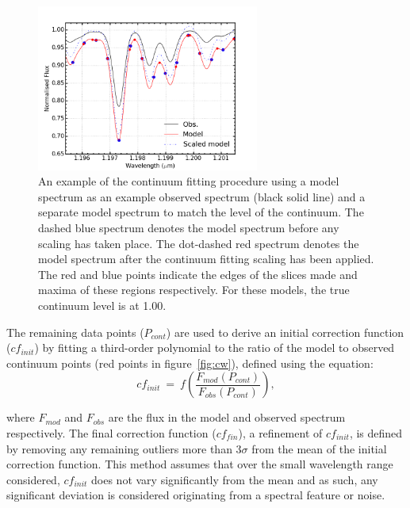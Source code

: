 \begin{figure}
 \centering
\includegraphics[width=0.65\textwidth]{JAnal/cftaction}
\caption[Example of continuum fitting]{
An example of the continuum fitting procedure using a model spectrum as an example observed spectrum (black solid line) and a separate model spectrum to match the level of the continuum.
The dashed blue spectrum denotes the model spectrum before any scaling has taken place.
The dot-dashed red spectrum denotes the model spectrum after the continuum fitting scaling has been applied.
The red and blue points indicate the edges of the slices made and maxima of these regions respectively.
For these models, the true continuum level is at 1.00.\label{fig:cftaction}
         }
\end{figure}

The remaining data points ($P_{cont}$) are used to derive an initial correction function
($cf_{init}$) by fitting a third-order polynomial to the ratio of the model to observed continuum points (red points in figure~\ref{fig:cw}), defined using the equation:
\begin{equation}
    cf_{init}~=~f\left(\frac{F_{mod}(P_{cont})}{F_{obs}(P_{cont})}\right),
    \label{eq:cf_init}
\end{equation}

\noindent where $F_{mod}$ and $F_{obs}$ are the flux in the model and observed spectrum respectively.
The final correction function ($cf_{fin}$), a refinement of $cf_{init}$,
is defined by removing any remaining outliers more than 3$\sigma$ from the mean of the initial correction function.
This method assumes that over the small wavelength range considered,
$cf_{init}$ does not vary significantly from the mean and as such, any significant deviation is considered originating from a spectral feature or noise.

